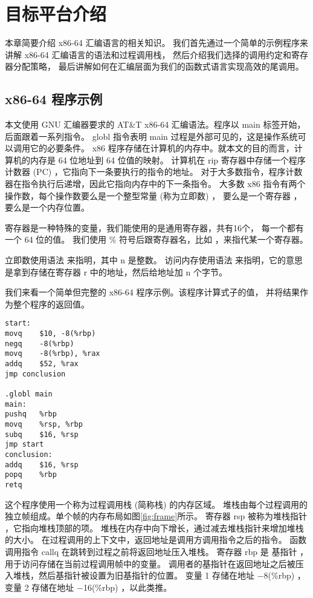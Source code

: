 
\chapter{目标平台介绍}

本章简要介绍 x86-64 汇编语言的相关知识。
我们首先通过一个简单的示例程序来讲解 x86-64 汇编语言的语法和过程调用栈，
然后介绍我们选择的调用约定和寄存器分配策略，
最后讲解如何在汇编层面为我们的函数式语言实现高效的尾调用。

\section{x86-64 程序示例}

本文使用 GNU 汇编器要求的 AT\&T x86-64 汇编语法。程序以 main 标签开始，后面跟着一系列指令。
globl 指令表明 main 过程是外部可见的，这是操作系统可以调用它的必要条件。
x86 程序存储在计算机的内存中。就本文的目的而言，计算机的内存是 64 位地址到 64 位值的映射。
计算机在 rip 寄存器中存储一个程序计数器 (PC) ，它指向下一条要执行的指令的地址。
对于大多数指令，程序计数器在指令执行后递增，因此它指向内存中的下一条指令。
大多数 x86 指令有两个操作数，每个操作数要么是一个整型常量 (称为立即数) ，
要么是一个寄存器 ，要么是一个内存位置。

寄存器是一种特殊的变量，我们能使用的是通用寄存器，共有16个，
每一个都有一个 64 位的值。
我们使用 \% 符号后跟寄存器名，比如 ，来指代某一个寄存器。

立即数使用语法  来指明，其中 n 是整数。
访问内存使用语法  来指明，它的意思是拿到存储在寄存器 r 中的地址，然后给地址加 n 个字节。

我们来看一个简单但完整的 x86-64 程序示例。该程序计算式子的值，
并将结果作为整个程序的返回值。

\begin{lstlisting}
start:
movq	$10, -8(%rbp)
negq	-8(%rbp)
movq	-8(%rbp), %rax
addq	$52, %rax
jmp conclusion

.globl main
main:
pushq	%rbp
movq	%rsp, %rbp
subq	$16, %rsp
jmp start
conclusion:
addq	$16, %rsp
popq	%rbp
retq
\end{lstlisting}

这个程序使用一个称为过程调用栈 (简称栈) 的内存区域。
堆栈由每个过程调用的独立帧组成。单个帧的内存布局如图\ref{fig:frame}所示。
寄存器 rsp 被称为堆栈指针 ，它指向堆栈顶部的项。
堆栈在内存中向下增长，通过减去堆栈指针来增加堆栈的大小。
在过程调用的上下文中，返回地址是调用方调用指令之后的指令。
函数调用指令 callq 在跳转到过程之前将返回地址压入堆栈。
寄存器 rbp 是 基指针 ，用于访问存储在当前过程调用帧中的变量。
调用者的基指针在返回地址之后被压入堆栈，然后基指针被设置为旧基指针的位置。
变量 1 存储在地址 −8(\%rbp) ，变量 2 存储在地址 −16(\%rbp) ，以此类推。


